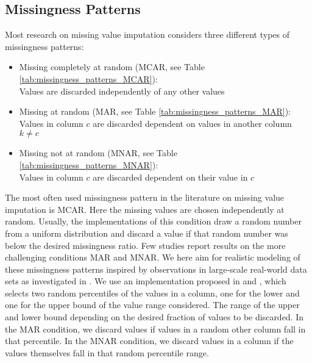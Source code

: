 \subsection{Missingness Patterns}
\label{sec:missingess_pattern}
Most research on missing value imputation considers three different types of missingness patterns:
%
\begin{itemize}
\item Missing completely at random (MCAR, see Table \ref{tab:missingness_patterns_MCAR}): \\
Values are discarded independently of any other values
\item Missing at random (MAR, see Table \ref{tab:missingness_patterns_MAR}): \\
Values in column $c$ are discarded dependent on values in another column $k\neq c$
\item Missing not at random (MNAR, see Table \ref{tab:missingness_patterns_MNAR}): \\
Values in column $c$ are discarded dependent on their value in $c$
\end{itemize}
%
The most often used missingness pattern in the literature on missing value imputation is MCAR. Here the missing values are chosen independently at random. Usually, the implementations of this condition draw a random number from a uniform distribution and discard a value if that random number was below the desired missingness ratio. Few studies report results on the more challenging conditions MAR and MNAR. We here aim for realistic modeling of these missingness patterns inspired by observations in large-scale real-world data sets as investigated in \cite{Biessmann2018a}. We use an implementation proposed in \cite{Schelter2020a} and \cite{Jenga}, which selects two random percentiles of the values in a column, one for the lower and one for the upper bound of the value range considered. The range of the upper and lower bound depending on the desired fraction of values to be discarded. In the MAR condition, we discard values if values in a random other column fall in that percentile. In the MNAR condition, we discard values in a column if the values themselves fall in that random percentile range.
%
